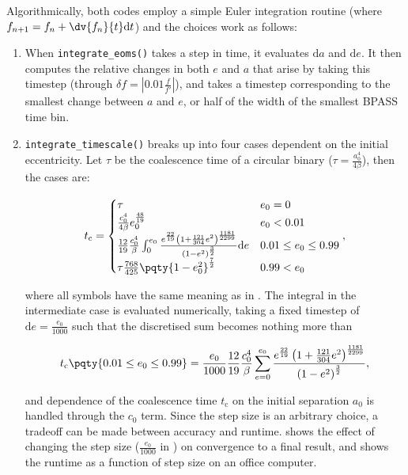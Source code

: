 Algorithmically, both codes employ a simple Euler integration routine (where $f_{n+1} = f_{n} + \dv{f_n}{t}\mathrm{d}t$) and the choices work as follows:

\begin{enumerate}
    \item When \texttt{integrate_eoms()} takes a step in time, it evaluates $\mathrm{d}a$ and $\mathrm{d}e$. It then computes the relative changes in both $e$ and $a$ that arise by taking this timestep (through $\delta f = \left|0.01\frac{f}{f'}\right|$), and takes a timestep corresponding to the smallest change between $a$ and $e$, or half of the width of the smallest BPASS time bin.
    \item \texttt{integrate_timescale()} breaks up  into four cases dependent on the initial eccentricity. Let $\tau$ be the coalescence time of a circular binary ($\tau=\frac{a_0^4}{4\beta}$), then the cases are:

    \begin{equation}
        t_\text{c} = \begin{cases}
            \tau & e_0 = 0 \\
            \frac{c_0^4}{4\beta} e_0^\frac{48}{19} & e_0 < 0.01 \\
            \frac{12}{19}\frac{c_0^4}{\beta}\int_0^{e_0} \frac{e^\frac{22}{19}\left(1+\frac{121}{304}e^2\right)^\frac{1181}{2299}}{\left(1-e^2\right)^\frac32}{ \mathrm{d}e} & 0.01 \leq e_0 \leq 0.99 \\
            \tau \frac{768}{425}\pqty{1-e_0^2}^\frac72 & 0.99 < e_0
        \end{cases},
    \end{equation}

    where all symbols have the same meaning as in . The integral in the intermediate case is evaluated numerically, taking a fixed timestep of $\mathrm{d}e=\frac{e_0}{1000}$ such that the discretised sum becomes nothing more than

    \begin{equation}
        t_\text{c}\pqty{0.01\leq e_0\leq 0.99} = \frac{e_0}{1000}\frac{12}{19}\frac{c_0^4}{\beta}\sum_{e=0}^{e_0} \frac{e^\frac{22}{19}\left(1+\frac{121}{304}e^2\right)^\frac{1181}{2299}}{\left(1-e^2\right)^\frac32},\label{eq:discrete_sum}
    \end{equation}

    and dependence of the coalescence time $t_\text{c}$ on the initial separation $a_0$ is handled through the $c_0$ term. Since the step size is an arbitrary choice, a tradeoff can be made between accuracy and runtime.  shows the effect of changing the step size ($\frac{e_0}{1000}$ in ) on convergence to a final result, and  shows the runtime as a function of step size on an office computer.
\end{enumerate}

